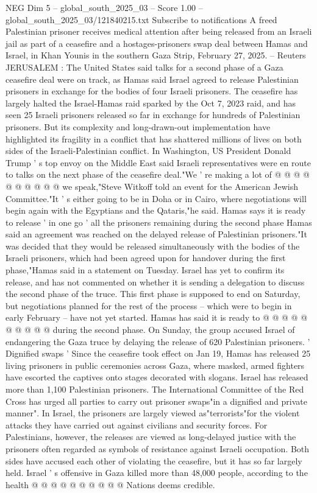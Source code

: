 \begin{textsample}{NEG Dim 5 – global\_south\_2025\_03 – Score 1.00 – global\_south\_2025\_03/121840215.txt}  \label{ex:f5_neg_264}
Subscribe to notifications A freed Palestinian prisoner receives medical attention after being released from an Israeli jail as part of a ceasefire and a hostages-prisoners swap deal between Hamas and Israel, in Khan Younis in the southern Gaza Strip, February 27, 2025. -- Reuters JERUSALEM : The United States said talks for a second phase of a Gaza ceasefire deal were on track, as Hamas said Israel agreed to release Palestinian prisoners in exchange for the bodies of four Israeli prisoners.
The ceasefire has largely halted the Israel-Hamas raid sparked by the Oct 7, 2023 raid, and has seen 25 Israeli prisoners released so far in exchange for hundreds of Palestinian prisoners.
But its complexity and long-drawn-out implementation have highlighted its fragility in a conflict that has shattered millions of lives on both sides of the Israeli-Palestinian conflict.
In Washington, US President Donald Trump ' s top envoy on the Middle East said Israeli representatives were en route to talks on the next phase of the ceasefire deal."We ' re making a lot of @ @ @ @ @ @ @ @ @ @ we speak,"Steve Witkoff told an event for the American Jewish Committee."It ' s either going to be in Doha or in Cairo, where negotiations will begin again with the Egyptians and the Qataris,"he said.
Hamas says it is ready to release ' in one go ' all the prisoners remaining during the second phase Hamas said an agreement was reached on the delayed release of Palestinian prisoners."It was decided that they would be released simultaneously with the bodies of the Israeli prisoners, which had been agreed upon for handover during the first phase,"Hamas said in a statement on Tuesday.
Israel has yet to confirm its release, and has not commented on whether it is sending a delegation to discuss the second phase of the truce.
This first phase is supposed to end on Saturday, but negotiations planned for the rest of the process -- which were to begin in early February -- have not yet started.
Hamas has said it is ready to @ @ @ @ @ @ @ @ @ @ during the second phase.
On Sunday, the group accused Israel of endangering the Gaza truce by delaying the release of 620 Palestinian prisoners. ' Dignified swaps ' Since the ceasefire took effect on Jan 19, Hamas has released 25 living prisoners in public ceremonies across Gaza, where masked, armed fighters have escorted the captives onto stages decorated with slogans.
Israel has released more than 1,100 Palestinian prisoners.
The International Committee of the Red Cross has urged all parties to carry out prisoner swaps"in a dignified and private manner".
In Israel, the prisoners are largely viewed as"terrorists"for the violent attacks they have carried out against civilians and security forces.
For Palestinians, however, the releases are viewed as long-delayed justice with the prisoners often regarded as symbols of resistance against Israeli occupation.
Both sides have accused each other of violating the ceasefire, but it has so far largely held.
Israel ' s offensive in Gaza killed more than 48,000 people, according to the health @ @ @ @ @ @ @ @ @ @ Nations deems credible.

\end{textsample}
